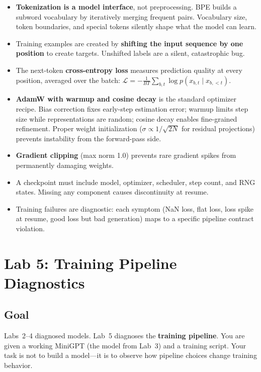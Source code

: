 \begin{takeaways}
\begin{itemize}[leftmargin=1.2em, itemsep=4pt]
  \item \textbf{Tokenization is a model interface}, not preprocessing. BPE builds a subword vocabulary by iteratively merging frequent pairs. Vocabulary size, token boundaries, and special tokens silently shape what the model can learn.
  \item Training examples are created by \textbf{shifting the input sequence by one position} to create targets. Unshifted labels are a silent, catastrophic bug.
  \item The next-token \textbf{cross-entropy loss} measures prediction quality at every position, averaged over the batch: $\mathcal{L} = -\frac{1}{BT}\sum_{b,t} \log p(x_{b,t} \mid x_{b,<t})$.
  \item \textbf{AdamW with warmup and cosine decay} is the standard optimizer recipe. Bias correction fixes early-step estimation error; warmup limits step size while representations are random; cosine decay enables fine-grained refinement. Proper weight initialization ($\sigma \propto 1/\sqrt{2N}$ for residual projections) prevents instability from the forward-pass side.
  \item \textbf{Gradient clipping} (max norm 1.0) prevents rare gradient spikes from permanently damaging weights.
  \item A checkpoint must include model, optimizer, scheduler, step count, and RNG states. Missing any component causes discontinuity at resume.
  \item Training failures are diagnostic: each symptom (NaN loss, flat loss, loss spike at resume, good loss but bad generation) maps to a specific pipeline contract violation.
\end{itemize}
\end{takeaways}


\section*{Lab 5: Training Pipeline Diagnostics}

\subsection*{Goal}

Labs~2--4 diagnosed models. Lab~5 diagnoses the \textbf{training pipeline}. You are given a working MiniGPT (the model from Lab~3) and a training script. Your task is not to build a model---it is to observe how pipeline choices change training behavior.

